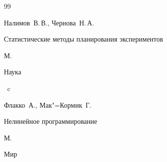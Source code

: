 \begin{thebibliography}{99}




\by Налимов~В.\,В., Чернова~Н.\,А.

\book Статистические методы планирования экспериментов

\publaddr М.

\publ Наука


~c




\by Флакко~А., Мак"=Кормик~Г.

\book Нелинейное программирование

\publaddr М.

\publ Мир




\end{thebibliography}



\renewcommand{\baselinestretch}{0.9}

\pagebreak



\makeengtitlem





% 

